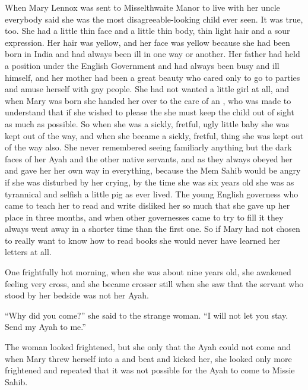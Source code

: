 \documentclass{fiche}
\begin{document}
\begin{texte}
When Mary Lennox was sent to Misselthwaite Manor to live with her uncle everybody said she
was the most disagreeable-looking child ever seen. It was true, too. She had a little thin
face and a little thin body, thin light hair and a sour expression. Her hair was yellow, and
her face was yellow because she had been born in India and had always been ill in one way or
another. Her father had held a position under the English Government and had always been busy
and ill himself, and her mother had been a great beauty who cared only to go to parties and
amuse herself with gay people. She had not wanted a little girl at all, and when Mary was
born she handed her over to the care of an , who was
made to understand that if she wished to please the  she must keep the
child out of sight as much as possible. So when she was a sickly, fretful, ugly little baby
she was kept out of the way, and when she became a sickly, fretful,
 thing she was kept out of the way
also. She never remembered seeing familiarly anything but the dark faces of her Ayah and the
other native servants, and as they always obeyed her and gave her her own way in everything,
because the Mem Sahib would be angry if she was disturbed by her crying, by the time she was
six years old she was as tyrannical and selfish a little pig as ever lived. The young English
governess who came to teach her to read and write disliked her so much that she gave up her
place in three months, and when other governesses came to try to fill it they always went
away in a shorter time than the first one. So if Mary had not chosen to really want to know
how to read books she would never have learned her letters at all.

One frightfully hot morning, when she was about nine years old, she awakened feeling very
cross, and she became crosser still when she saw that the servant who stood by her bedside
was not her Ayah.

``Why did you come?'' she said to the strange woman. ``I will not let you stay. Send my Ayah
to me.''

The woman looked frightened, but she only  that the Ayah
could not come and when Mary threw herself into a  and beat and kicked her, she looked only more frightened and repeated that it was not
possible for the Ayah to come to Missie Sahib.


\end{texte}
\end{document}
